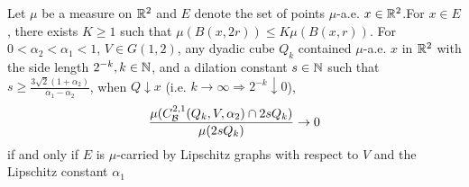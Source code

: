 \begin{lemma}
    Let $\mu$ be a measure on $\mathbb{R}^2$ and $E$ denote the set of points $\mu$-a.e. $x\in\mathbb{R}^2$.For $x\in E$, there exists $K\geq 1$ such that $\mu(B(x, 2r))\leq K\mu(B(x,r))$. For $0<\alpha_2<\alpha_1<1$, $V\in G(1,2)$, any dyadic cube $Q_k$ contained $\mu$-a.e. $x$ in $\mathbb{R}^2$ with the side length $2^{-k}, k\in\mathbb{N}$, and a dilation constant $s\in\mathbb{N}$ such that $s \geq \frac{3\sqrt{2}(1+\alpha_2)}{\alpha_1-\alpha_2}$, when $Q\downarrow x$ (i.e. $k\rightarrow\infty \Rightarrow 2^{-k}\downarrow 0$),
    \begin{equation}
        \frac{\mu(C_\mathcal B^{2,1}(Q_k, V, \alpha_2)\cap 2sQ_k)}{\mu(2sQ_k)} \rightarrow 0
    \end{equation}
    if and only if $E$ is $\mu$-carried by Lipschitz graphs {\color{red}with respect to $V$ and the Lipschitz constant $\alpha_1$}
\end{lemma}
